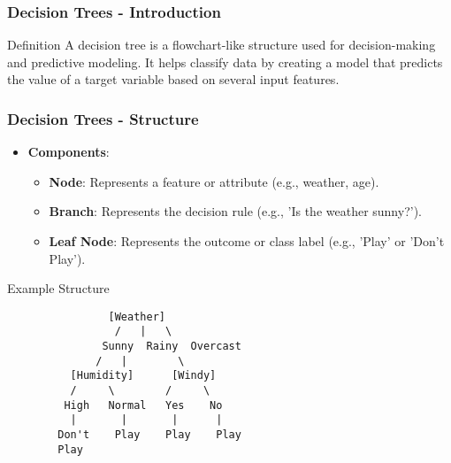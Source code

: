 \documentclass{beamer}
\begin{document}
\begin{frame}[fragile]
    \frametitle{Decision Trees - Introduction}
    \begin{block}{Definition}
        A decision tree is a flowchart-like structure used for decision-making and predictive modeling. It helps classify data by creating a model that predicts the value of a target variable based on several input features.
    \end{block}
\end{frame}

\begin{frame}[fragile]
    \frametitle{Decision Trees - Structure}
    \begin{itemize}
        \item \textbf{Components}:
        \begin{itemize}
            \item \textbf{Node}: Represents a feature or attribute (e.g., weather, age).
            \item \textbf{Branch}: Represents the decision rule (e.g., 'Is the weather sunny?').
            \item \textbf{Leaf Node}: Represents the outcome or class label (e.g., 'Play' or 'Don't Play').
        \end{itemize}
    \end{itemize}

    \begin{block}{Example Structure}
        \begin{verbatim}
                [Weather]
                 /   |   \
               Sunny  Rainy  Overcast
              /   |        \
          [Humidity]      [Windy]
          /     \        /     \
         High   Normal   Yes    No
          |       |       |      |
        Don't    Play    Play    Play
        Play
        \end{verbatim}
    \end{block}
\end{frame}
\end{document}
